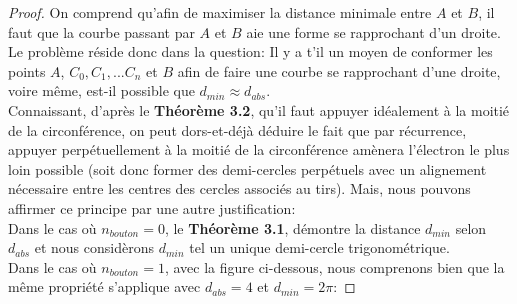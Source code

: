 \documentclass[a4paper]{amsart}
\theoremstyle{definition}
\theoremstyle{remark}
\numberwithin{equation}{section}
\begin{document}
\begin{proof}
  On comprend qu'afin de maximiser la distance minimale entre $A$ et $B$, il faut que la courbe passant par $A$ et $B$ aie une forme se rapprochant d'un droite.
  Le problème réside donc dans la question: Il y a t'il un moyen de conformer les points $A$, $C_0, C_1, ... C_n$ et $B$ afin de faire une courbe se rapprochant d'une droite, voire même, est-il possible que $d_{min}\approx d_{abs}$.\\

  Connaissant, d'après le \textbf{Théorème 3.2}, qu'il faut appuyer idéalement à la moitié de la circonférence, on peut dors-et-déjà déduire le fait que par récurrence, appuyer perpétuellement à la moitié de la circonférence amènera l'électron le plus loin
  possible (soit donc former des demi-cercles perpétuels avec un alignement nécessaire entre les centres des cercles associés au tirs). Mais, nous pouvons affirmer ce principe par une autre justification:\\

  Dans le cas où $n_{bouton}=0$, le \textbf{Théorème 3.1}, démontre la distance $d_{min}$ selon $d_{abs}$ et nous considèrons $d_{min}$ tel un unique demi-cercle trigonométrique.\\

  Dans le cas où $n_{bouton}=1$, avec la figure ci-dessous, nous comprenons bien que la même propriété s'applique avec $d_{abs}=4$ et $d_{min}=2\pi$:


\end{proof}
\end{document}
